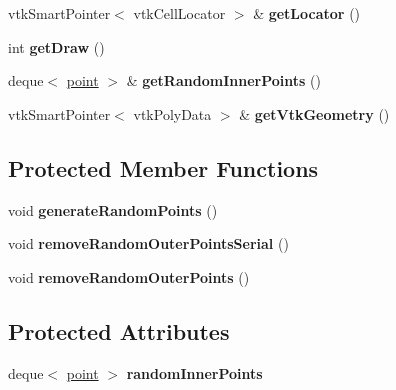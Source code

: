\begin{DoxyCompactItemize}
vtk\+Smart\+Pointer$<$ vtk\+Cell\+Locator $>$ \& {\bfseries get\+Locator} ()
\item 
\mbox{\label{class_simple_domain2_d_a15b519453137710f0c8897a4eda7c25d}} 
int {\bfseries get\+Draw} ()
\item 
\mbox{\label{class_simple_domain2_d_a08eddf131c1ed43cf7cc34e347fd372f}} 
deque$<$ \mbox{\hyperlink{structpoint}{point}} $>$ \& {\bfseries get\+Random\+Inner\+Points} ()
\item 
\mbox{\label{class_simple_domain2_d_a0c4505e70d9530586bcb0ab943bb9a9a}} 
vtk\+Smart\+Pointer$<$ vtk\+Poly\+Data $>$ \& {\bfseries get\+Vtk\+Geometry} ()
\end{DoxyCompactItemize}
\subsection*{Protected Member Functions}
\begin{DoxyCompactItemize}
\item 
\mbox{\label{class_simple_domain2_d_aeeb59155f6dec3e57e515c4b3a703e08}} 
void {\bfseries generate\+Random\+Points} ()
\item 
\mbox{\label{class_simple_domain2_d_af1cab33fce288f46723cb7860f7ed8bb}} 
void {\bfseries remove\+Random\+Outer\+Points\+Serial} ()
\item 
\mbox{\label{class_simple_domain2_d_af4f587398d458be9dfb09e47abfc3ad9}} 
void {\bfseries remove\+Random\+Outer\+Points} ()
\end{DoxyCompactItemize}
\subsection*{Protected Attributes}
\begin{DoxyCompactItemize}
\item 
\mbox{\label{class_simple_domain2_d_a3baccded48c6c2d227c86938639c7e3b}} 
deque$<$ \mbox{\hyperlink{structpoint}{point}} $>$ {\bfseries random\+Inner\+Points}
\end{DoxyCompactItemize}


